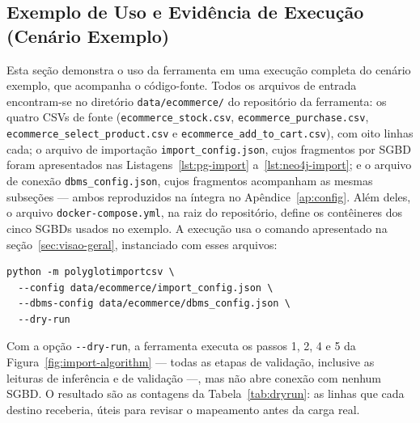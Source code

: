 \subsection{Exemplo de Uso e Evidência de Execução (Cenário Exemplo)}
\label{sec:exemplo-uso}

Esta seção demonstra o uso da ferramenta em uma execução completa do cenário exemplo, que
acompanha o código-fonte. Todos os arquivos de entrada encontram-se no
diretório \texttt{data/\allowbreak ecommerce/} do repositório da ferramenta: os quatro
CSVs de fonte (\texttt{ecommerce\_\allowbreak stock.csv},
\texttt{ecommerce\_\allowbreak purchase.csv},
\texttt{ecommerce\_\allowbreak select\_product.csv} e
\texttt{ecommerce\_\allowbreak add\_to\_cart.csv}), com oito linhas cada; o arquivo de
importação \texttt{import\_config.json}, cujos fragmentos por SGBD foram apresentados nas
Listagens~\ref{lst:pg-import} a~\ref{lst:neo4j-import}; e o arquivo de conexão
\texttt{dbms\_config.json}, cujos fragmentos acompanham as mesmas subseções --- ambos
reproduzidos na íntegra no Apêndice~\ref{ap:config}. Além deles, o arquivo
\texttt{docker-compose.yml}, na raiz do repositório, define os contêineres dos cinco
SGBDs usados no exemplo. A execução usa o comando apresentado na
seção~\ref{sec:visao-geral}, instanciado com esses arquivos:

\begin{lstlisting}[style=bashstyle]
python -m polyglotimportcsv \
  --config data/ecommerce/import_config.json \
  --dbms-config data/ecommerce/dbms_config.json \
  --dry-run
\end{lstlisting}

Com a opção \texttt{-{}-dry-run}, a ferramenta executa os passos 1, 2, 4 e 5 da
Figura~\ref{fig:import-algorithm} --- todas as etapas de validação, inclusive as leituras
de inferência e de validação ---, mas não abre conexão com nenhum SGBD. O resultado são
as contagens da Tabela~\ref{tab:dryrun}: as linhas que cada destino receberia, úteis para
revisar o mapeamento antes da carga real.

